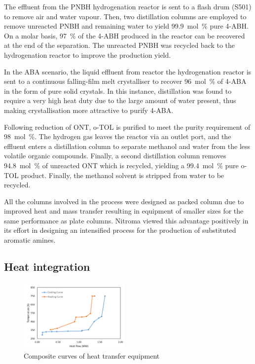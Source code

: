 The effluent from the PNBH hydrogenation reactor is sent to a flash drum (S501) to remove air and water vapour. Then, two distillation columns are employed to remove unreacted PNBH and remaining water to yield  \SI{99.9}{mol\percent} pure 4-ABH. On a molar basis, \SI{97}{\percent} of the 4-ABH produced in the reactor can be recovered at the end of the separation. The unreacted  PNBH was recycled back to the hydrogenation reactor to improve the production yield.

In the ABA scenario, the liquid effluent from reactor the hydrogenation reactor is sent to a continuous falling-film melt crystalliser to recover \SI{96}{mol\percent} of 4-ABA in the form of pure solid crystals. In this instance, distillation was found to require a very high heat duty due to the large amount of water present, thus making crystallisation more attractive to purify 4-ABA. 

Following reduction of ONT, o-TOL is purified to meet the purity requirement of \SI{98}{mol\percent}.
The hydrogen gas leaves the reactor via an outlet port, and the effluent enters a distillation column to separate methanol and water from the less volatile organic compounds.
Finally, a second distillation column removes \SI{94.8}{mol\percent} of unreacted ONT which is recycled, yielding a \SI{99.4}{mol\percent} pure o-TOL product. Finally, the methanol solvent is stripped from water to be recycled.

All the columns involved in the process were designed as packed column due to improved heat and mass transfer resulting in equipment of smaller sizes for the same performance as plate columns. Nitroma viewed this advantage positively in its effort in designing an intensified process for the production of substituted aromatic amines.

\subsection{Heat integration}

\begin{figure}
    \vspace{-\intextsep}
    \centering
    \includegraphics[width=0.48\textwidth]{chapters/1-synthesis/1-Figures/composite-curves.PNG}
    \caption{Composite curves of heat transfer equipment}
    \label{fig:heat}
\end{figure}


